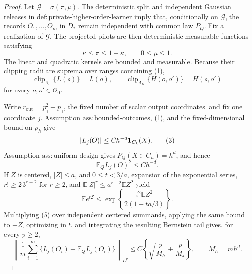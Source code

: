 \documentclass{article}
\begin{document}
\begin{proof}
Let \(\mathcal G=\sigma(\bar\pi,\bar\mu)\).  The deterministic split and independent Gaussian releases in \(\mathrm{def{:}private\text{-}higher\text{-}order\text{-}learner}\) imply that, conditionally on \(\mathcal G\), the records \(O_1,\ldots,O_m\) in \(D_*\) remain independent with common law \(P_Q\).  Fix a realization of \(\mathcal G\).  The projected pilots are then deterministic measurable functions satisfying
\[
 \kappa\leq \bar\pi\leq1-\kappa,
 \qquad 0\leq\bar\mu\leq1.
\tag{1}
\]
The linear and quadratic kernels are bounded and measurable.  Because their clipping radii are suprema over ranges containing (1),
\[
 \operatorname{clip}_{\Lambda_L}\{L(o)\}=L(o),
 \qquad
 \operatorname{clip}_{\Lambda_H}\{H(o,o')\}=H(o,o')
\tag{2}
\]
for every \(o,o'\in\mathcal O_0\).

Write \(r_{\mathrm{out}}=p_\gamma^2+p_\gamma\), the fixed number of scalar output coordinates, and fix one coordinate \(j\).  Assumption \(\mathrm{ass{:}bounded\text{-}outcomes}\), (1), and the fixed-dimensional bound on \(\rho_h\) give
\[
 |L_j(O)|\leq C h^{-d}{\bf1}_{C_h}(X).
\tag{3}
\]
Assumption \(\mathrm{ass{:}uniform\text{-}design}\) gives \(P_Q(X\in C_h)=h^d\), and hence
\[
 \mathbb E_Q L_j(O)^2\leq C h^{-d}.
\tag{4}
\]
If \(Z\) is centered, \(|Z|\le a\), and \(0\le t<3/a\), expansion of the exponential series, \(r!\ge2\,3^{r-2}\) for \(r\ge2\), and \(\mathbb E|Z|^r\le a^{r-2}\mathbb EZ^2\) yield
\[
 \mathbb E e^{tZ}
 \le\exp\!\left\{\frac{t^2\mathbb EZ^2}{2(1-ta/3)}\right\}.
\tag{5}
\]
Multiplying (5) over independent centered summands, applying the same bound to \(-Z\), optimizing in \(t\), and integrating the resulting Bernstein tail gives, for every \(p\ge2\),
\[
 \left\|\frac1m\sum_{i=1}^m
       \{L_j(O_i)-\mathbb E_Q L_j(O_i)\}\right\|_{L^p}
 \leq C\left\{\sqrt{\frac p{M_h}}+\frac p{M_h}\right\},
 \qquad M_h=mh^d.
\tag{6}
\]


\end{proof}
\end{document}
